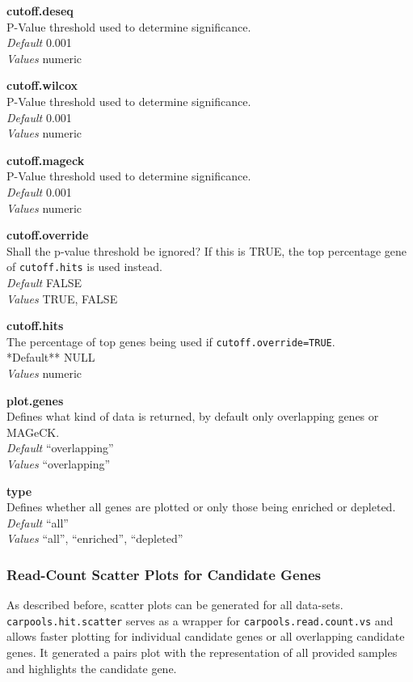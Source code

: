 \documentclass[]{article}
\begin{document}
\textbf{cutoff.deseq}\\
P-Value threshold used to determine significance.\\
\emph{Default} 0.001\\
\emph{Values} numeric

\textbf{cutoff.wilcox}\\
P-Value threshold used to determine significance.\\
\emph{Default} 0.001\\
\emph{Values} numeric

\textbf{cutoff.mageck}\\
P-Value threshold used to determine significance.\\
\emph{Default} 0.001\\
\emph{Values} numeric

\textbf{cutoff.override}\\
Shall the p-value threshold be ignored? If this is TRUE, the top
percentage gene of \texttt{cutoff.hits} is used instead.\\
\emph{Default} FALSE\\
\emph{Values} TRUE, FALSE

\textbf{cutoff.hits}\\
The percentage of top genes being used if
\texttt{cutoff.override=TRUE}.\\
*Default** NULL\\
\emph{Values} numeric

\textbf{plot.genes}\\
Defines what kind of data is returned, by default only overlapping genes
or MAGeCK.\\
\emph{Default} ``overlapping''\\
\emph{Values} ``overlapping''

\textbf{type}\\
Defines whether all genes are plotted or only those being enriched or
depleted.\\
\emph{Default} ``all''\\
\emph{Values} ``all'', ``enriched'', ``depleted''

\subsubsection{Read-Count Scatter Plots for Candidate
Genes}\label{read-count-scatter-plots-for-candidate-genes}

As described before, scatter plots can be generated for all data-sets.
\texttt{carpools.hit.scatter} serves as a wrapper for
\texttt{carpools.read.count.vs} and allows faster plotting for
individual candidate genes or all overlapping candidate genes. It
generated a pairs plot with the representation of all provided samples
and highlights the candidate gene.
\end{document}
